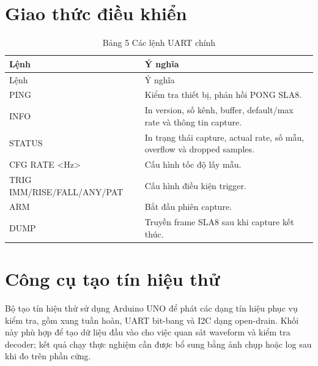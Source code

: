 \section{Giao thức điều khiển}\label{giao-thux1ee9c-ux111iux1ec1u-khiux1ec3n}

\begin{longtable}[]{@{}
  >{\raggedright\arraybackslash}p{}
  >{\raggedright\arraybackslash}p{}@{}}
\caption{Bảng 5 Các lệnh UART chính}\tabularnewline
\toprule\noalign{}
\begin{minipage}[b]{\linewidth}\raggedright
Lệnh
\end{minipage} & \begin{minipage}[b]{\linewidth}\raggedright
Ý nghĩa
\end{minipage} \\
\midrule\noalign{}
\endfirsthead
\toprule\noalign{}
\begin{minipage}[b]{\linewidth}\raggedright
Lệnh
\end{minipage} & \begin{minipage}[b]{\linewidth}\raggedright
Ý nghĩa
\end{minipage} \\
\midrule\noalign{}
\endhead
\bottomrule\noalign{}
\endlastfoot
PING & Kiểm tra thiết bị, phản hồi PONG SLA8. \\
INFO & In version, số kênh, buffer, default/max rate và thông tin capture. \\
STATUS & In trạng thái capture, actual rate, số mẫu, overflow và dropped samples. \\
CFG RATE \textless Hz\textgreater{} & Cấu hình tốc độ lấy mẫu. \\
TRIG IMM/RISE/FALL/ANY/PAT & Cấu hình điều kiện trigger. \\
ARM & Bắt đầu phiên capture. \\
DUMP & Truyền frame SLA8 sau khi capture kết thúc. \\
\end{longtable}

\section{Công cụ tạo tín hiệu thử}\label{cuxf4ng-cux1ee5-tux1ea1o-tuxedn-hiux1ec7u-thux1eed}

Bộ tạo tín hiệu thử sử dụng Arduino UNO để phát các dạng tín hiệu phục vụ kiểm tra, gồm xung tuần hoàn, UART bit-bang và I2C dạng open-drain. Khối này phù hợp để tạo dữ liệu đầu vào cho việc quan sát waveform và kiểm tra decoder; kết quả chạy thực nghiệm cần được bổ sung bằng ảnh chụp hoặc log sau khi đo trên phần cứng.

